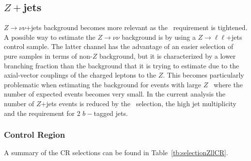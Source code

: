\subsection{$Z+$jets}

$Z \rightarrow \nu\nu$+jets background becomes more relevant as the \MET\ requirement is tightened. A possible way to estimate the $Z \rightarrow
\nu \nu$ background is by using a $Z \rightarrow \ell \ell$+jets control
sample. The latter channel has the advantage of an easier selection of
pure samples in terms of non-$Z$ background, but it is characterized by a
lower branching fraction than the background that it is trying to
estimate due to the  axial-vector couplings of the charged leptons to the $Z$.  This becomes particularly problematic when estimating the
background for events with large $Z$ \pT\ where the number of expected
events becomes very small. In the current analysis the number of
$Z$+jets events is reduced by the \MET\ selection, the high jet
multiplicity and the requirement for 2 $b-$tagged jets.


   
\subsubsection{Control Region}
 A summary of the CR selections can be found in Table~\ref{tb:selectionZllCR}. \\

